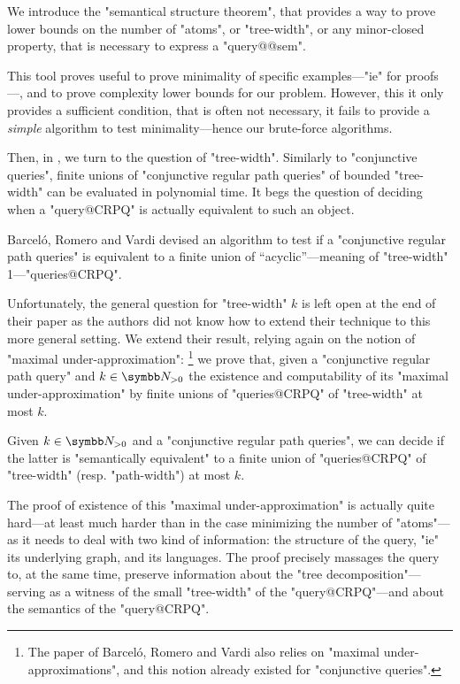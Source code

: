 \begin{contribution}
	We introduce the "semantical structure theorem", that provides
	a way to prove lower bounds on the number
	of "atoms", or "tree-width", or any minor-closed property,
	that is necessary to express a "query@@sem".
\end{contribution}

This tool proves useful to prove minimality of specific examples---"ie"
for proofs---, and to prove complexity lower bounds for our problem.
However, this it only provides a sufficient condition, that is often not
necessary, it fails to provide a \emph{simple} algorithm to test minimality---hence our
brute-force algorithms.

Then, in , we turn to the question
of "tree-width". Similarly to "conjunctive queries", finite unions of
"conjunctive regular path queries"
of bounded "tree-width" can be evaluated in polynomial time.
It begs the question of deciding when a "query@CRPQ" is actually equivalent
to such an object.

\begin{known}
	Barceló, Romero and Vardi devised an algorithm to test
	if a "conjunctive regular path queries" is equivalent to
	a finite union of ``acyclic''---meaning of "tree-width" 1---"queries@CRPQ".
\end{known}

Unfortunately, the general question for "tree-width" $k$ is left open at the end
of their paper as the authors did not know how to extend their technique to this
more general setting. We extend their result, relying again on the notion
of "maximal under-approximation":%
\footnote{The paper of Barceló, Romero and Vardi
also relies on "maximal under-approximations", and this notion already existed
for "conjunctive queries".}
we prove that, given a "conjunctive regular path query" and
$k\in\Np$ the existence and computability of its "maximal under-approximation"
by finite unions of "queries@CRPQ" of "tree-width" at most $k$.

\begin{contribution}
	Given $k\in \Np$ and a "conjunctive regular path queries",
	we can decide if the latter is "semantically equivalent"
	to a finite union of "queries@CRPQ" of "tree-width"
	(resp. "path-width") at most $k$.
\end{contribution}

The proof of existence of this "maximal under-approximation" is
actually quite hard---at least much harder than in the case minimizing
the number of "atoms"---as it needs to deal with two kind of information:
the structure of the query, "ie" its underlying graph, and its languages.
The proof precisely massages the query to, at the same time,
preserve information about the "tree decomposition"---serving as a
witness of the small "tree-width" of the "query@CRPQ"---and about the
semantics of the "query@CRPQ".

